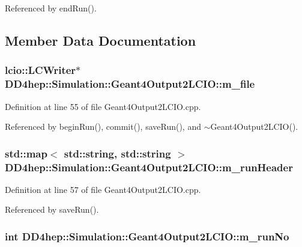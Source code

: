 Referenced by endRun().

\subsection{Member Data Documentation}
\hypertarget{class_d_d4hep_1_1_simulation_1_1_geant4_output2_l_c_i_o_a53ad4cd77ad5b3b95105cee1ac2ca6f8}{
\subsubsection[{m\_\-file}]{\setlength{\rightskip}{0pt plus 5cm}lcio::LCWriter$\ast$ {\bf DD4hep::Simulation::Geant4Output2LCIO::m\_\-file}}}
\label{class_d_d4hep_1_1_simulation_1_1_geant4_output2_l_c_i_o_a53ad4cd77ad5b3b95105cee1ac2ca6f8}


Definition at line 55 of file Geant4Output2LCIO.cpp.

Referenced by beginRun(), commit(), saveRun(), and $\sim$Geant4Output2LCIO().\hypertarget{class_d_d4hep_1_1_simulation_1_1_geant4_output2_l_c_i_o_ad4dec33a908a569451f8f51eb3954eba}{
\subsubsection[{m\_\-runHeader}]{\setlength{\rightskip}{0pt plus 5cm}std::map$<$ std::string, std::string $>$ {\bf DD4hep::Simulation::Geant4Output2LCIO::m\_\-runHeader}}}
\label{class_d_d4hep_1_1_simulation_1_1_geant4_output2_l_c_i_o_ad4dec33a908a569451f8f51eb3954eba}


Definition at line 57 of file Geant4Output2LCIO.cpp.

Referenced by saveRun().\hypertarget{class_d_d4hep_1_1_simulation_1_1_geant4_output2_l_c_i_o_a6f4cb683c0f3b248ee518aa9ca7cf0c6}{
\subsubsection[{m\_\-runNo}]{\setlength{\rightskip}{0pt plus 5cm}int {\bf DD4hep::Simulation::Geant4Output2LCIO::m\_\-runNo}}}
\label{class_d_d4hep_1_1_simulation_1_1_geant4_output2_l_c_i_o_a6f4cb683c0f3b248ee518aa9ca7cf0c6}


